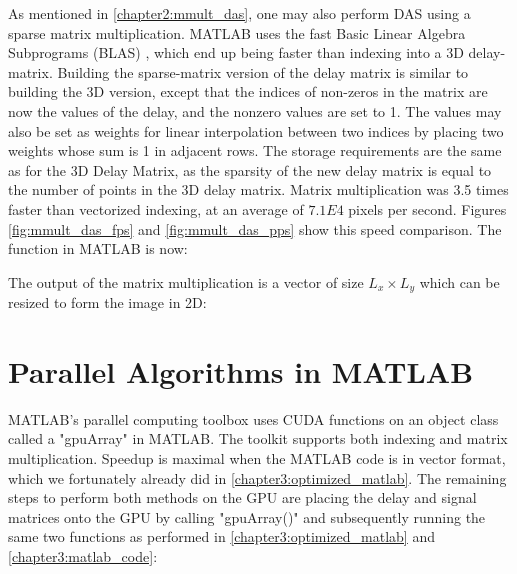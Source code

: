     As mentioned in \ref{chapter2:mmult_das}, one may also perform DAS using a sparse matrix multiplication. MATLAB uses the fast Basic Linear Algebra Subprograms (BLAS) \cite{BLASBasicLinear} \cite{davisAlgorithm1000SuiteSparse2019}, which end up being faster than indexing into a 3D delay-matrix. Building the sparse-matrix version of the delay matrix is similar to building the 3D version, except that the indices of non-zeros in the matrix are now the values of the delay, and the nonzero values are set to 1. The values may also be set as weights for linear interpolation between two indices by placing two weights whose sum is 1 in adjacent rows. The storage requirements are the same as for the 3D Delay Matrix, as the sparsity of the new delay matrix is equal to the number of points in the 3D delay matrix. Matrix multiplication was 3.5 times faster than vectorized indexing, at an average of $7.1E4$ pixels per second. Figures \ref{fig:mmult_das_fps} and \ref{fig:mmult_das_pps} show this speed comparison. The function in MATLAB is now:

    

    The output of the matrix multiplication is a vector of size $L_x \times L_y$ which can be resized to form the image in 2D:

    


\section{Parallel Algorithms in MATLAB}
\label{chapter3:parallel_matlab}

    MATLAB's parallel computing toolbox \cite{MATLABGPUComputing} uses CUDA functions on an object class called a "gpuArray" in MATLAB. The toolkit supports both indexing and matrix multiplication. Speedup is maximal when the MATLAB code is in vector format, which we fortunately already did in \ref{chapter3:optimized_matlab}. The remaining steps to perform both methods on the GPU are placing the delay and signal matrices onto the GPU by calling "gpuArray()" and subsequently running the same two functions as performed in \ref{chapter3:optimized_matlab} and \ref{chapter3:matlab_code}:

